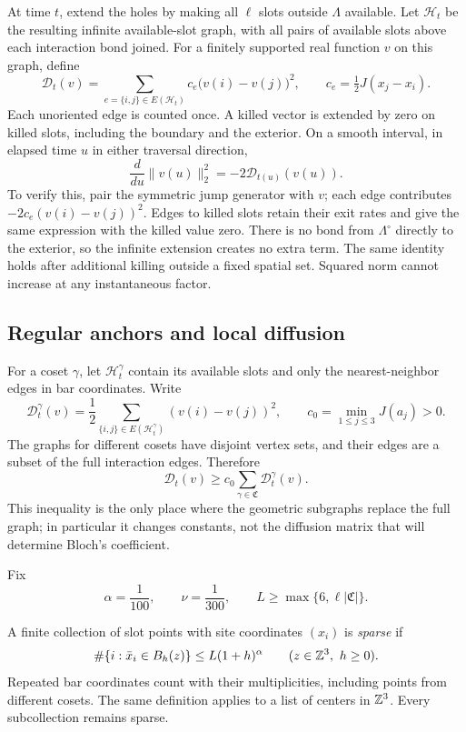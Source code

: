 At time \(t\), extend the holes by making all \(\ell\) slots outside
\(\Lambda\) available.  Let \(\mathcal H_t\) be the resulting infinite
available-slot graph, with all pairs of available slots above each
interaction bond joined.  For a finitely supported real function \(v\)
on this graph, define
\begin{equation}\label{eq:full-energy}
 \mathcal D_t(v)=
 \sum_{e=\{i,j\}\in E(\mathcal H_t)}c_e\bigl(v(i)-v(j)\bigr)^2,
 \qquad c_e=\tfrac12 J(x_j-x_i).
\end{equation}
Each unoriented edge is counted once.  A killed vector is extended by
zero on killed slots, including the boundary and the exterior.
On a smooth interval, in elapsed time \(u\) in either traversal direction,
\begin{equation}\label{eq:norm-dissipation}
 \frac{d}{du}\|v(u)\|_2^2=-2\mathcal D_{t(u)}(v(u)).
\end{equation}
To verify this, pair the symmetric jump generator with \(v\); each
edge contributes \(-2c_e(v(i)-v(j))^2\).  Edges to killed slots retain
their exit rates and give the same expression with the killed value
zero.  There is no bond from \(\Lambda^\circ\) directly to the exterior,
so the infinite extension creates no extra term.  The same identity
holds after additional killing outside a fixed spatial set.  Squared
norm cannot increase at any instantaneous factor.

\subsection{Regular anchors and local diffusion}

For a coset \(\gamma\), let \(\mathcal H_t^\gamma\) contain its
available slots and only the nearest-neighbor edges in bar coordinates.
Write
\[
 \mathcal D_t^\gamma(v)
   =\frac12\sum_{\{i,j\}\in E(\mathcal H_t^\gamma)}
                   (v(i)-v(j))^2,
 \qquad c_0=\min_{1\le j\le3}J(a_j)>0.
\]
The graphs for different cosets have disjoint vertex sets, and their
edges are a subset of the full interaction edges.  Therefore
\begin{equation}\label{eq:energy-comparison}
 \mathcal D_t(v)\ge c_0
       \sum_{\gamma\in\mathfrak C}\mathcal D_t^\gamma(v).
\end{equation}
This inequality is the only place where the geometric subgraphs replace
the full graph; in particular it changes constants, not the diffusion
matrix that will determine Bloch's coefficient.

Fix
\[
 \alpha=\frac1{100},\qquad \nu=\frac1{300},\qquad
 L\ge\max\{6,\ell|\mathfrak C|\}.
\]
\begin{definition}\label{def:sparse}
A finite collection of slot points with site coordinates \((x_i)\) is
\emph{sparse} if
\begin{equation}\label{eq:sparse-growth}
 \#\{i:\bar x_i\in B_h(z)\}\le L(1+h)^\alpha
 \qquad(z\in\mathbb Z^3,\ h\ge0).
\end{equation}
Repeated bar coordinates count with their multiplicities, including
points from different cosets.  The same definition applies to a list of
centers in \(\mathbb Z^3\).  Every subcollection remains sparse.
\end{definition}

